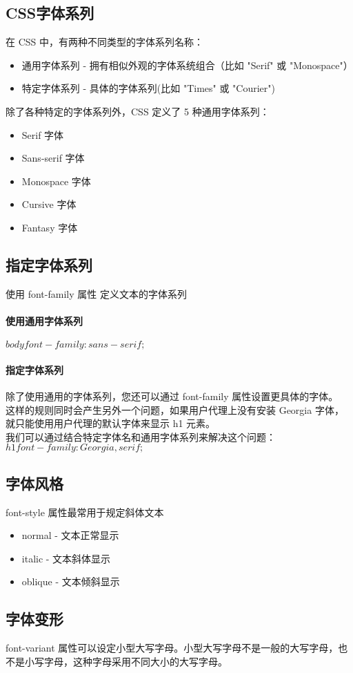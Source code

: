 \documentclass[10pt,UTF8]{ctexart}
\begin{document}
\subsection{CSS字体系列}
在 CSS 中，有两种不同类型的字体系列名称：
\begin{itemize}
\item 通用字体系列 - 拥有相似外观的字体系统组合（比如 "Serif" 或 "Monospace"）
\item 特定字体系列 - 具体的字体系列(比如 "Times" 或 "Courier")
\end{itemize}
除了各种特定的字体系列外，CSS 定义了 5 种通用字体系列：
\begin{itemize}
\item Serif 字体
\item Sans-serif 字体
\item Monospace 字体
\item Cursive 字体
\item Fantasy 字体
\end{itemize}
\subsection{指定字体系列}
使用 font-family 属性 定义文本的字体系列
\paragraph{使用通用字体系列}$body {font-family: sans-serif;}$
\paragraph{指定字体系列}除了使用通用的字体系列，您还可以通过 font-family 属性设置更具体的字体。\\
这样的规则同时会产生另外一个问题，如果用户代理上没有安装 Georgia 字体，就只能使用用户代理的默认字体来显示 h1 元素。\\
我们可以通过结合特定字体名和通用字体系列来解决这个问题：$h1 {font-family: Georgia, serif;}$
\subsection{字体风格}
font-style 属性最常用于规定斜体文本
\begin{itemize}
\item normal - 文本正常显示
\item italic - 文本斜体显示
\item oblique - 文本倾斜显示
\end{itemize}
\subsection{字体变形}
font-variant 属性可以设定小型大写字母。小型大写字母不是一般的大写字母，也不是小写字母，这种字母采用不同大小的大写字母。
\end{document}
